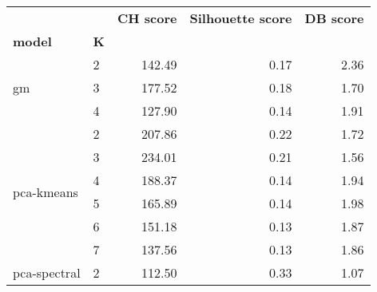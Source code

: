 \begin{tabular}{llrrr}
\toprule
                                 &            & \textbf{CH score} & \textbf{Silhouette score} & \textbf{DB score} \\
\textbf{model}                   & \textbf{K} &                   &                           &                   \\
\midrule
\multirow[c]{3}{*}{gm}           & 2          & 142.49            & 0.17                      & 2.36              \\
                                 & 3          & 177.52            & 0.18                      & 1.70              \\
                                 & 4          & 127.90            & 0.14                      & 1.91              \\
\midrule
\multirow[c]{6}{*}{pca-kmeans}   & 2          & 207.86            & 0.22                      & 1.72              \\
                                 & 3          & 234.01            & 0.21                      & 1.56              \\
                                 & 4          & 188.37            & 0.14                      & 1.94              \\
                                 & 5          & 165.89            & 0.14                      & 1.98              \\
                                 & 6          & 151.18            & 0.13                      & 1.87              \\
                                 & 7          & 137.56            & 0.13                      & 1.86              \\
\midrule
\multirow[c]{6}{*}{pca-spectral} & 2          & 112.50            & 0.33                      & 1.07              \\

\end{tabular}
